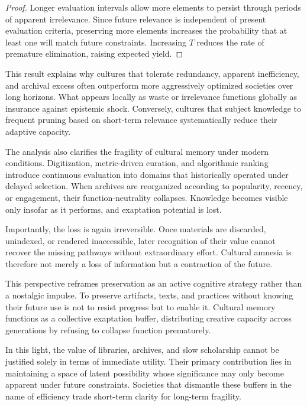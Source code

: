 \documentclass[11pt]{article}
\theoremstyle{definition}
\begin{document}
\begin{proof}
Longer evaluation intervals allow more elements to persist through periods of apparent irrelevance. Since future relevance is independent of present evaluation criteria, preserving more elements increases the probability that at least one will match future constraints. Increasing $T$ reduces the rate of premature elimination, raising expected yield.
\end{proof}

This result explains why cultures that tolerate redundancy, apparent inefficiency, and archival excess often outperform more aggressively optimized societies over long horizons. What appears locally as waste or irrelevance functions globally as insurance against epistemic shock. Conversely, cultures that subject knowledge to frequent pruning based on short-term relevance systematically reduce their adaptive capacity.

The analysis also clarifies the fragility of cultural memory under modern conditions. Digitization, metric-driven curation, and algorithmic ranking introduce continuous evaluation into domains that historically operated under delayed selection. When archives are reorganized according to popularity, recency, or engagement, their function-neutrality collapses. Knowledge becomes visible only insofar as it performs, and exaptation potential is lost.

Importantly, the loss is again irreversible. Once materials are discarded, unindexed, or rendered inaccessible, later recognition of their value cannot recover the missing pathways without extraordinary effort. Cultural amnesia is therefore not merely a loss of information but a contraction of the future.

This perspective reframes preservation as an active cognitive strategy rather than a nostalgic impulse. To preserve artifacts, texts, and practices without knowing their future use is not to resist progress but to enable it. Cultural memory functions as a collective exaptation buffer, distributing creative capacity across generations by refusing to collapse function prematurely.

In this light, the value of libraries, archives, and slow scholarship cannot be justified solely in terms of immediate utility. Their primary contribution lies in maintaining a space of latent possibility whose significance may only become apparent under future constraints. Societies that dismantle these buffers in the name of efficiency trade short-term clarity for long-term fragility.
\end{document}
